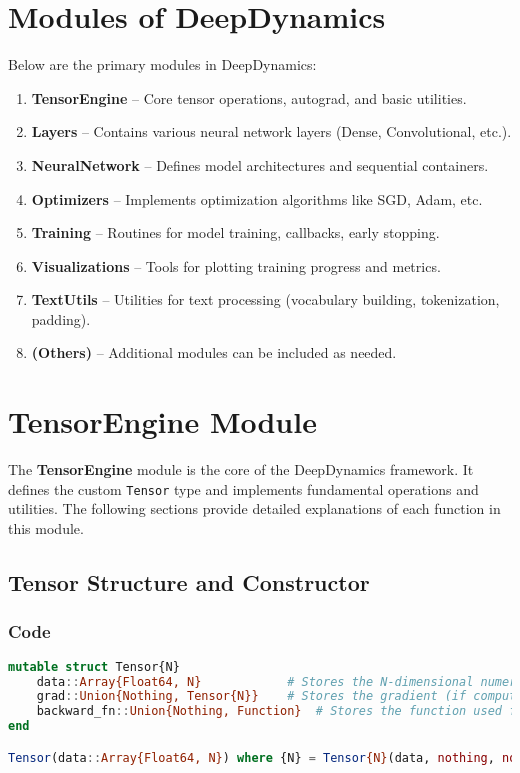 \documentclass[11pt]{article}
\begin{document}
\section{Modules of DeepDynamics}
Below are the primary modules in DeepDynamics:
\begin{enumerate}[label=\arabic*.]
  \item \textbf{TensorEngine} -- Core tensor operations, autograd, and basic utilities.
  \item \textbf{Layers} -- Contains various neural network layers (Dense, Convolutional, etc.).
  \item \textbf{NeuralNetwork} -- Defines model architectures and sequential containers.
  \item \textbf{Optimizers} -- Implements optimization algorithms like SGD, Adam, etc.
  \item \textbf{Training} -- Routines for model training, callbacks, early stopping.
  \item \textbf{Visualizations} -- Tools for plotting training progress and metrics.
  \item \textbf{TextUtils} -- Utilities for text processing (vocabulary building, tokenization, padding).
  \item \textbf{(Others)} -- Additional modules can be included as needed.
\end{enumerate}

\newpage

\section{TensorEngine Module}
The \textbf{TensorEngine} module is the core of the DeepDynamics framework. It defines the custom \texttt{Tensor} type and implements fundamental operations and utilities. The following sections provide detailed explanations of each function in this module.

\subsection{Tensor Structure and Constructor}
\subsubsection*{Code}
\begin{lstlisting}[language=Julia]
mutable struct Tensor{N}
    data::Array{Float64, N}            # Stores the N-dimensional numerical data.
    grad::Union{Nothing, Tensor{N}}    # Stores the gradient (if computed) with the same dimensions.
    backward_fn::Union{Nothing, Function}  # Stores the function used for backpropagation.
end

Tensor(data::Array{Float64, N}) where {N} = Tensor{N}(data, nothing, nothing)
\end{lstlisting}
\end{document}
